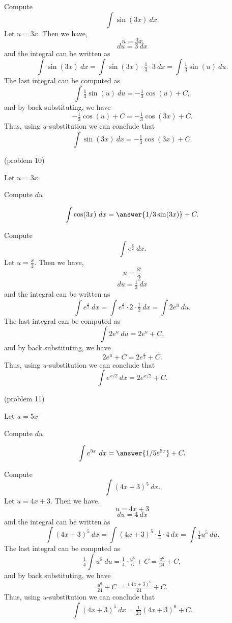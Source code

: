 \documentclass[handout]{ximera}
\begin{document}
\begin{example}[example 10] Compute 
\[\int \sin(3x) \ dx.\]
Let $u = 3x$.  Then we have,
\[u = 3x\]
\[du = 3 \ dx\]
and the integral can be written as 
\[\int\sin(3x) \ dx =  \int \sin(3x) \cdot \tfrac13\cdot 3 \   dx =   \int \tfrac13 \sin(u) \ du.\]
The last integral can be computed as 
\[ \int \tfrac13 \sin(u) \ du = -\tfrac13 \cos(u) + C,\]
and by back substituting, we have 
\[-\tfrac13 \cos(u) + C = -\tfrac13 \cos(3x) + C.\]
Thus, using $u$-substitution we can conclude that
\[\int \sin(3x) \ dx =  -\tfrac13 \cos(3x) + C.\]
\end{example}

\begin{problem}(problem 10)
\begin{hint}
Let $u = 3x$
\end{hint}
\begin{hint}
Compute $du$
\end{hint}
\[\int \cos(3x) \ dx = \answer{1/3 \sin(3x)} +C.\]
\end{problem}






\begin{example}[example 11] Compute 
\[\int e^{\frac{x}{2}} \ dx.\]
Let $u = \frac{x}{2}$.  Then we have,
\[u = \frac{x}{2}\]
\[du = \tfrac12 \ dx\]
and the integral can be written as 
\[\int e^{\frac{x}{2}} \ dx =  \int e^{\frac{x}{2}} \cdot 2\cdot \tfrac{1}{2}  \   dx =   \int 2e^u \ du.\]
The last integral can be computed as 
\[\int 2e^u \ du = 2 e^u + C,\]
and by back substituting, we have 
\[2e^u + C = 2e^{\frac{x}{2}}+ C.\]
Thus, using $u$-substitution we can conclude that
\[\int e^{x/2} \ dx = 2e^{x/2} + C.\]
\end{example}


\begin{problem}(problem 11)
\begin{hint}
Let $u = 5x$
\end{hint}
\begin{hint}
Compute $du$
\end{hint}
\[\int e^{5x} \ dx = \answer{1/5 e^{5x}} +C.\]
\end{problem}


\begin{example}[example 12] Compute 
\[\int (4x+3)^5 \ dx.\]
Let $u = 4x+3$. Then we have,
\[u = 4x+3\]
\[du = 4 \ dx\]
and the integral can be written as 
\[\int (4x+3)^5 \ dx =   \int (4x+3)^5 \cdot \tfrac14\cdot 4  \   dx =   \int \tfrac14 u^5 \ du.\]
The last integral can be computed as 
\[\tfrac14  \int u^5 \ du = \tfrac14  \cdot \tfrac{u^6}{6} + C = \tfrac{u^6}{24} + C,\]
and by back substituting, we have 
\[\tfrac{u^6}{24} + C = \tfrac{(4x+3)^6}{24}+ C.\]
Thus, using $u$-substitution we can conclude that
\[\int (4x+3)^5 \ dx = \tfrac{1}{24}(4x+3)^6 + C.\]
\end{example}
\end{document}
